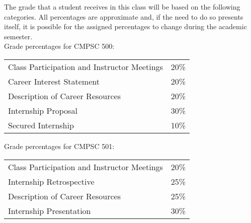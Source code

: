 % 
% 

The grade that a student receives in this class will be based on the following categories. All percentages are
approximate and, if the need to do so presents itself, it is possible for the assigned percentages to change during the
academic semester. \\

Grade percentages for CMPSC 500:
\begin{center}
  \begin{tabular}{ll}
    Class Participation and Instructor Meetings & 20\% \\
    Career Interest Statement & 20\% \\
    Description of Career Resources & 20\% \\
    Internship Proposal & 30\% \\
    Secured Internship & 10\% \\
  \end{tabular}
\end{center}

\newpage
Grade percentages for CMPSC 501:

\vspace{-.1in}
\begin{center}
  \begin{tabular}{ll}
    Class Participation and Instructor Meetings & 20\% \\
    Internship Retrospective & 25\% \\
    Description of Career Resources & 25\% \\
    Internship Presentation & 30\% \\
  \end{tabular}
\end{center}

